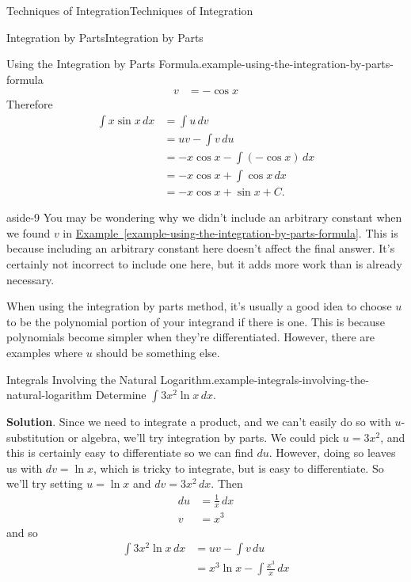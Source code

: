 \documentclass[10pt,]{book}
\numberwithin{equation}{section}
\begin{document}
\begin{chapterptx}{Techniques of Integration}{}{Techniques of Integration}{}{}
\begin{sectionptx}{Integration by Parts}{}{Integration by Parts}{}{}
\begin{example}{Using the Integration by Parts Formula.}{example-using-the-integration-by-parts-formula}
\begin{align*}
v & = -\cos x 
\end{align*}
\hypertarget{p-503}{}%
Therefore%
%
\begin{align*}
\int x\sin x\,dx & = \int u\,dv \\
& = uv - \int v\,du \\
& = -x\cos x - \int (-\cos x)\,dx \\
& = -x\cos x + \int\cos x\,dx \\
& = -x\cos x + \sin x + C. 
\end{align*}
\end{example}
\begin{aside}{}{aside-9}%
\hypertarget{p-504}{}%
You may be wondering why we didn't include an arbitrary constant when we found \(v\) in \hyperref[example-using-the-integration-by-parts-formula]{Example~\ref{example-using-the-integration-by-parts-formula}}. This is because including an arbitrary constant here doesn't affect the final answer. It's certainly not incorrect to include one here, but it adds more work than is already necessary.%
\end{aside}
\hypertarget{p-505}{}%
When using the integration by parts method, it's usually a good idea to choose \(u\) to be the polynomial portion of your integrand if there is one. This is because polynomials become simpler when they're differentiated. However, there are examples where \(u\) should be something else.%
\begin{example}{Integrals Involving the Natural Logarithm.}{example-integrals-involving-the-natural-logarithm}%
\hypertarget{p-506}{}%
Determine \(\int 3x^{2}\ln x\,dx\).%
\par\smallskip%
\noindent\textbf{Solution}.\hypertarget{solution-111}{}\quad%
\hypertarget{p-507}{}%
Since we need to integrate a product, and we can't easily do so with \(u\)-substitution or algebra, we'll try integration by parts. We could pick \(u = 3x^{2}\), and this is certainly easy to differentiate so we can find \(du\). However, doing so leaves us with \(dv = \ln x\), which is tricky to integrate, but is easy to differentiate. So we'll try setting \(u = \ln x\) and \(dv = 3x^{2}\,dx\). Then%
%
\begin{align*}
du & = \frac{1}{x}\,dx \\
v & = x^{3} 
\end{align*}
\hypertarget{p-508}{}%
and so%
%
\begin{align*}
\int 3x^{2}\ln x\,dx & = uv - \int v\,du \\
& = x^{3}\ln x - \int \frac{x^{3}}{x}\,dx \\

\end{align*}
\end{example}
\end{sectionptx}
\end{chapterptx}
\end{document}

